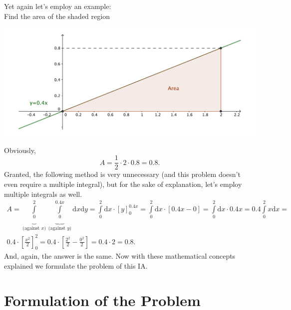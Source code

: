 Yet again let's employ an example: \\
Find the area of the shaded region\\
\begin{center}
\includegraphics[scale=0.4]{pic-multiexample}
\end{center}
Obviously, $$A=\frac{1}{2}\cdot 2 \cdot 0.8 = 0.8.$$ Granted, the following method is very unnecessary (and this problem doesn't even require a multiple integral), but for the sake of explanation, let's employ multiple integrals as well.
\begin{gather*}
A = \underbrace{\int\limits_{0}^{2}}_{\text{(against } x\text{)}} \underbrace{\int\limits_{0}^{0.4x}}_{\text{(against } y\text{)}} \mathrm{d}x \mathrm{d}y =  \int\limits_{0}^{2} \mathrm{d}x \cdot \left[ y \right]_{0}^{0.4x} =  \int\limits_{0}^{2} \mathrm{d}x \cdot  \left[ 0.4x - 0 \right] = \int\limits_{0}^{2} \mathrm{d}x \cdot 0.4x = 0.4 \int\limits_{0}^{2} x\mathrm{d}x = \\
0.4 \cdot \left[ \frac{x^{2}}{2} \right]_{0}^{2} = 0.4 \cdot \left[ \frac{2^{2}}{2} - \frac{0^{2}}{2} \right] = 0.4 \cdot 2 = 0.8.
\end{gather*}
And, again, the answer is the same. Now with these mathematical concepts explained we formulate the problem of this IA.

\section{Formulation of the Problem}

